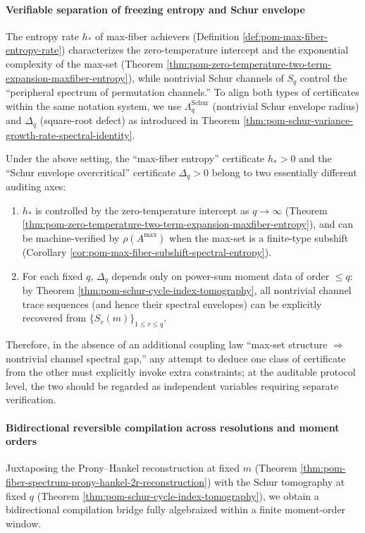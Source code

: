 \paragraph{Verifiable separation of freezing entropy and Schur envelope}
The entropy rate \(h_\ast\) of max-fiber achievers (Definition \ref{def:pom-max-fiber-entropy-rate}) characterizes the zero-temperature intercept and the exponential complexity of the max-set (Theorem \ref{thm:pom-zero-temperature-two-term-expansion-maxfiber-entropy}),
while nontrivial Schur channels of \(S_q\) control the ``peripheral spectrum of permutation channels.''
To align both types of certificates within the same notation system, we use
\(\Lambda_q^{\mathrm{Schur}}\) (nontrivial Schur envelope radius) and \(\Delta_q\) (square-root defect) as introduced in Theorem \ref{thm:pom-schur-variance-growth-rate-spectral-identity}.

\begin{proposition}\label{prop:pom-freezing-vs-schur-envelope-separation}
Under the above setting, the ``max-fiber entropy'' certificate \(h_\ast>0\) and the ``Schur envelope overcritical'' certificate \(\Delta_q>0\) belong to two essentially different auditing axes:
\begin{enumerate}
  \item \(h_\ast\) is controlled by the zero-temperature intercept as \(q\to\infty\) (Theorem \ref{thm:pom-zero-temperature-two-term-expansion-maxfiber-entropy}), and can be machine-verified by \(\rho(A^{\max})\) when the max-set is a finite-type subshift (Corollary \ref{cor:pom-max-fiber-subshift-spectral-entropy}).
  \item For each fixed \(q\), \(\Delta_q\) depends only on power-sum moment data of order \(\le q\): by Theorem \ref{thm:pom-schur-cycle-index-tomography},
  all nontrivial channel trace sequences (and hence their spectral envelopes) can be explicitly recovered from \(\{S_r(m)\}_{1\le r\le q}\).
\end{enumerate}
Therefore, in the absence of an additional coupling law ``max-set structure \(\Rightarrow\) nontrivial channel spectral gap,''
any attempt to deduce one class of certificate from the other must explicitly invoke extra constraints;
at the auditable protocol level, the two should be regarded as independent variables requiring separate verification.
\end{proposition}

\paragraph{Bidirectional reversible compilation across resolutions and moment orders}
Juxtaposing the Prony--Hankel reconstruction at fixed \(m\) (Theorem \ref{thm:pom-fiber-spectrum-prony-hankel-2r-reconstruction})
with the Schur tomography at fixed \(q\) (Theorem \ref{thm:pom-schur-cycle-index-tomography}), we obtain a bidirectional compilation bridge fully algebraized within a finite moment-order window.


